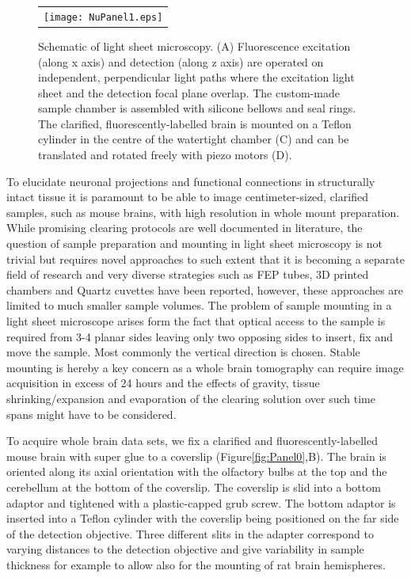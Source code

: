 \documentclass[12pt]{spieman}  %
\begin{document}
\begin{figure}
   \begin{center}
   \begin{tabular}{c}
   \texttt{[image: NuPanel1.eps]}
   \end{tabular}
   \end{center}
   \caption{\label{fig:Panel1} Schematic of light sheet microscopy. (A) Fluorescence excitation (along x axis) and detection (along z axis) are operated on independent, perpendicular light paths where the excitation light sheet and the detection focal plane overlap. The custom-made sample chamber is assembled with silicone bellows and seal rings. The clarified, fluorescently-labelled brain is mounted on a Teflon cylinder in the centre of the watertight chamber (C) and can be translated and rotated freely with piezo motors (D).} 
   \end{figure}		
		
To elucidate neuronal projections and functional connections in structurally intact tissue it is paramount to be able to image centimeter-sized, clarified samples, such as mouse brains, with high resolution in whole mount preparation. While promising clearing protocols are well documented in literature\cite{Chung2013,Tomer2014}, the question of sample preparation and mounting in light sheet microscopy is not trivial but requires novel approaches to such extent that it is becoming a separate field of research and very diverse strategies such as FEP tubes, 3D printed chambers and Quartz cuvettes have been reported\cite{Kaufmann2012,Pitrone2013,Olarte2012,Tomer2014}, however, these approaches are limited to much smaller sample volumes. The problem of sample mounting in a light sheet microscope arises form the fact that optical access to the sample is required from 3-4 planar sides leaving only two opposing sides to insert, fix and move the sample. Most commonly the vertical direction is chosen. Stable mounting is hereby a key concern as a whole brain tomography can require image acquisition in excess of 24 hours and the effects of gravity, tissue shrinking/expansion and evaporation of the clearing solution over such time spans might have to be considered. 

To acquire whole brain data sets, we fix a clarified and fluorescently-labelled mouse brain with super glue to a coverslip (Figure\ref{fig:Panel0},B). The brain is oriented along its axial orientation with the olfactory bulbs at the top and the cerebellum at the bottom of the coverslip. The coverslip is slid into a bottom adaptor and tightened with a plastic-capped grub screw. The bottom adaptor is inserted into a Teflon cylinder with the coverslip being positioned on the far side of the detection objective. Three different slits in the adapter correspond to varying distances to the detection objective and give variability in sample thickness for example to allow also for the mounting of rat brain hemispheres.
	
\end{document}
